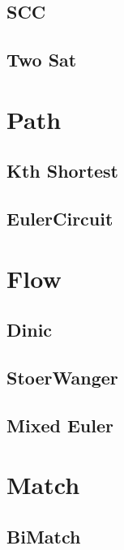 \documentclass[10pt,twocolumn,oneside]{article}
\begin{document}
    \subsection{SCC}
    
    \subsection{Two Sat}
    
    \newpage

    \section{Path}
    \subsection{Kth Shortest}
    
    \subsection{EulerCircuit}
    
    \newpage

    \section{Flow}
    \subsection{Dinic}
    
    \subsection{StoerWanger}
    
    \subsection{Mixed Euler}
    
    \newpage

    \section{Match}
    \subsection{BiMatch}
    
\end{document}
